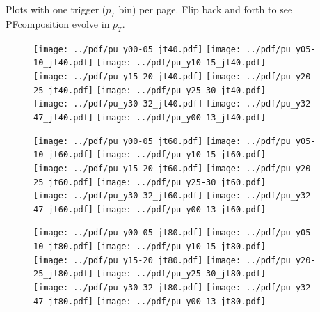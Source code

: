 \documentclass[landscape,10pt]{beamer} %
\begin{document}
Plots with one trigger ($p_T$ bin) per page. Flip back and forth to see PFcomposition evolve in $p_T$.

\newpage

\begin{figure}[p]
\centering
\texttt{[image: ../pdf/pu\_y00-05\_jt40.pdf]}
\texttt{[image: ../pdf/pu\_y05-10\_jt40.pdf]}
\texttt{[image: ../pdf/pu\_y10-15\_jt40.pdf]}\\
\texttt{[image: ../pdf/pu\_y15-20\_jt40.pdf]}
\texttt{[image: ../pdf/pu\_y20-25\_jt40.pdf]}
\texttt{[image: ../pdf/pu\_y25-30\_jt40.pdf]}\\
\texttt{[image: ../pdf/pu\_y30-32\_jt40.pdf]}
\texttt{[image: ../pdf/pu\_y32-47\_jt40.pdf]}
\texttt{[image: ../pdf/pu\_y00-13\_jt40.pdf]}
\end{figure}

\newpage

\begin{figure}[p]
\centering
\texttt{[image: ../pdf/pu\_y00-05\_jt60.pdf]}
\texttt{[image: ../pdf/pu\_y05-10\_jt60.pdf]}
\texttt{[image: ../pdf/pu\_y10-15\_jt60.pdf]}\\
\texttt{[image: ../pdf/pu\_y15-20\_jt60.pdf]}
\texttt{[image: ../pdf/pu\_y20-25\_jt60.pdf]}
\texttt{[image: ../pdf/pu\_y25-30\_jt60.pdf]}\\
\texttt{[image: ../pdf/pu\_y30-32\_jt60.pdf]}
\texttt{[image: ../pdf/pu\_y32-47\_jt60.pdf]}
\texttt{[image: ../pdf/pu\_y00-13\_jt60.pdf]}
\end{figure}

\newpage

\begin{figure}[p]
\centering
\texttt{[image: ../pdf/pu\_y00-05\_jt80.pdf]}
\texttt{[image: ../pdf/pu\_y05-10\_jt80.pdf]}
\texttt{[image: ../pdf/pu\_y10-15\_jt80.pdf]}\\
\texttt{[image: ../pdf/pu\_y15-20\_jt80.pdf]}
\texttt{[image: ../pdf/pu\_y20-25\_jt80.pdf]}
\texttt{[image: ../pdf/pu\_y25-30\_jt80.pdf]}\\
\texttt{[image: ../pdf/pu\_y30-32\_jt80.pdf]}
\texttt{[image: ../pdf/pu\_y32-47\_jt80.pdf]}
\texttt{[image: ../pdf/pu\_y00-13\_jt80.pdf]}
\end{figure}
\end{document}
